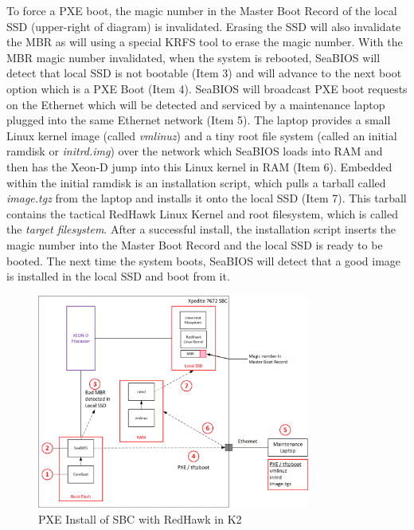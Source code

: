 \documentclass[12pt]{article}
\begin{document}
To force a PXE boot, the magic number in the Master Boot Record of the local SSD
(upper-right of diagram) is invalidated.  Erasing the SSD will also invalidate the
MBR as will using a special KRFS tool to erase the magic number.  With the MBR
magic number invalidated, when the system is rebooted, SeaBIOS will detect that
local SSD is not bootable (Item 3) and will advance to the next boot option
which is a PXE Boot (Item 4).  SeaBIOS will broadcast PXE boot requests on the
Ethernet which will be detected and serviced by a maintenance laptop plugged
into the same Ethernet network (Item 5).  The laptop provides a small Linux
kernel image (called \emph{vmlinuz}) and a tiny root file system (called an
initial ramdisk or \emph{initrd.img}) over the network which SeaBIOS loads into
RAM and then has the Xeon-D jump into this Linux kernel in RAM (Item 6).
Embedded within the initial ramdisk is an installation script, which pulls a
tarball called \emph{image.tgz} from the laptop and installs it onto the local
SSD (Item 7).  This tarball contains the tactical RedHawk Linux Kernel and root
filesystem, which is called the \emph{target filesystem}.  After a successful
install, the installation script inserts the magic number into the Master Boot
Record and the local SSD is ready to be booted.  The next time the system boots,
SeaBIOS will detect that a good image is installed in the local SSD and boot
from it.

\begin{figure}[H]
    \begin{center}
    \includegraphics[width=0.8\textwidth]{img/pxe_install}
    \caption{PXE Install of SBC with RedHawk in K2}
    \label{fig:pxe_install}
    \end{center}
\end{figure}
\end{document}
